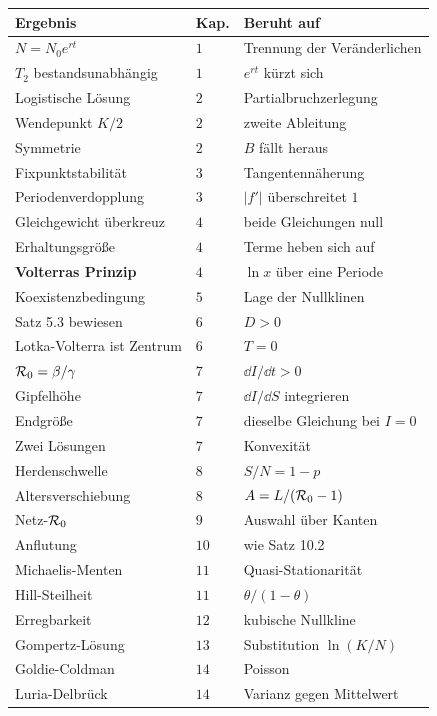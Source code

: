 \begin{merksatz}
\begin{center}
{\small
\renewcommand{\arraystretch}{1.42}
\begin{tabular}{@{}P{3.6cm}P{1.2cm}P{3.4cm}@{}}
\toprule
\textbf{Ergebnis} & \textbf{Kap.} & \textbf{Beruht auf}\\
\midrule
$N = N_0e^{rt}$ & $1$ & Trennung der Veränderlichen\\
$T_2$ bestandsunabhängig & $1$ & $e^{rt}$ kürzt sich\\
Logistische Lösung & $2$ & Partialbruch\-zerlegung\\
Wendepunkt $K/2$ & $2$ & zweite Ableitung\\
Symmetrie & $2$ & $B$ fällt heraus\\
Fixpunktstabilität & $3$ & Tangentennäherung\\
Perioden\-verdopplung & $3$ & $|f'|$ überschreitet $1$\\
Gleichgewicht überkreuz & $4$ & beide Gleichungen null\\
Erhaltungsgröße & $4$ & Terme heben sich auf\\
\textbf{Volterras Prinzip} & $4$ & $\ln x$ über eine Periode\\
Koexistenz\-bedingung & $5$ & Lage der Nullklinen\\
Satz 5.3 bewiesen & $6$ & $D > 0$\\
Lotka-Volterra ist Zentrum & $6$ & $T=0$\\
$\mathcal{R}_0 = \beta/\gamma$ & $7$ & $\dd I/\dd t > 0$\\
Gipfelhöhe & $7$ & $\dd I/\dd S$ integrieren\\
Endgröße & $7$ & dieselbe Gleichung bei $I=0$\\
Zwei Lösungen & $7$ & Konvexität\\
Herdenschwelle & $8$ & $S/N = 1-p$\\
Altersverschiebung & $8$ & $A = L/(\mathcal{R}_0-1)$\\
Netz-$\mathcal{R}_0$ & $9$ & Auswahl über Kanten\\
Anflutung & $10$ & wie Satz 10.2\\
Michaelis-Menten & $11$ & Quasi-Stationarität\\
Hill-Steilheit & $11$ & $\theta/(1-\theta)$\\
Erregbarkeit & $12$ & kubische Nullkline\\
Gompertz-Lösung & $13$ & Substitution $\ln(K/N)$\\
Goldie-Coldman & $14$ & Poisson\\
Luria-Delbrück & $14$ & Varianz gegen Mittelwert\\
\bottomrule
\end{tabular}}
\end{center}
\end{merksatz}

